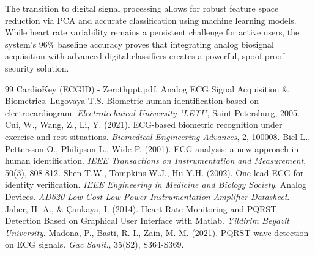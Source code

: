\documentclass[12pt,a4paper]{report}
\begin{document}
The transition to digital signal processing allows for robust feature space reduction via PCA and accurate classification using machine learning models. While heart rate variability remains a persistent challenge for active users, the system's 96\% baseline accuracy proves that integrating analog biosignal acquisition with advanced digital classifiers creates a powerful, spoof-proof security solution.

\newpage
\begin{thebibliography}{99}
 CardioKey (ECGID) - Zerothppt.pdf. Analog ECG Signal Acquisition \& Biometrics.
 Lugovaya T.S. Biometric human identification based on electrocardiogram. \textit{Electrotechnical University "LETI"}, Saint-Petersburg, 2005.
 Cui, W., Wang, Z., Li, Y. (2021). ECG-based biometric recognition under exercise and rest situations. \textit{Biomedical Engineering Advances}, 2, 100008.
 Biel L., Pettersson O., Philipson L., Wide P. (2001). ECG analysis: a new approach in human identification. \textit{IEEE Transactions on Instrumentation and Measurement}, 50(3), 808-812.
 Shen T.W., Tompkins W.J., Hu Y.H. (2002). One-lead ECG for identity verification. \textit{IEEE Engineering in Medicine and Biology Society}.
 Analog Devices. \textit{AD620 Low Cost Low Power Instrumentation Amplifier Datasheet}.
 Jaber, H. A., \& \c{C}ankaya, I. (2014). Heart Rate Monitoring and PQRST Detection Based on Graphical User Interface with Matlab. \textit{Yildirim Beyazit University}.
 Madona, P., Basti, R. I., Zain, M. M. (2021). PQRST wave detection on ECG signals. \textit{Gac Sanit.}, 35(S2), S364-S369.
\end{thebibliography}
\end{document}
